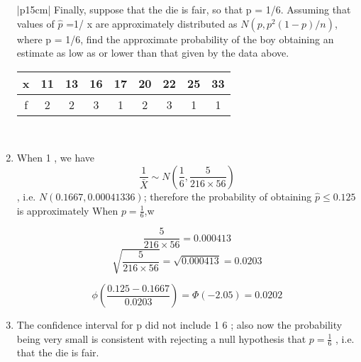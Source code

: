 \documentclass[a4paper,12pt]{article}
\begin{document}
\begin{enumerate}
\newpage    
    \begin{table}[ht!]
     \centering
     \begin{tabular}{|p{15cm}|}
     \hline        
\noindent 
Finally, suppose that the die is fair, so that p = 1/6. Assuming that values of
$\hat{p}$ =1/ x are approximately distributed as $N(p, p^2(1 - p)/n)$, where p = 1/6, find
the approximate probability of the boy obtaining an estimate as low as or lower
than that given by the data above.

\begin{center}
\begin{tabular}{|c|c|c|c|c|c|c|c|c|} \hline
x & 11 & 13 & 16 & 17 & 20 & 22 & 25 & 33 \\ \hline
f & 2 & 2 & 3 & 1 & 2 & 3 & 1 & 1 \\ \hline
\end{tabular}
\end{center}

\\ \hline
      \end{tabular}
    \end{table}


\item When 1 , we have \[ \frac{1}{\bar{X}} \sim N\left( \frac{1}{6} , \frac{5}{216 \times 56} \right)\]
, i.e. $N(0.1667, 0.00041336)$; therefore
the probability of obtaining $\hat{p} \leq 0.125$ is approximately
When $p = \frac{1}{6}$,w 

\[ \frac{5}{216 \times 56}  = 0.000413\]
\[ \sqrt{\frac{5}{216 \times 56}}  = \sqrt{0.000413} = 0.0203\]


\[ \phi\left( \frac{0.125 - 0.1667}{0.0203} \right) = \Phi (-2.05) = 0.0202\]

\item The confidence interval for p did not include 1
6
; also now the probability being very
small is consistent with rejecting a null hypothesis that 
$p = \frac{1}{6}$
, i.e. that the die is fair.
\end{enumerate}
\end{document}
